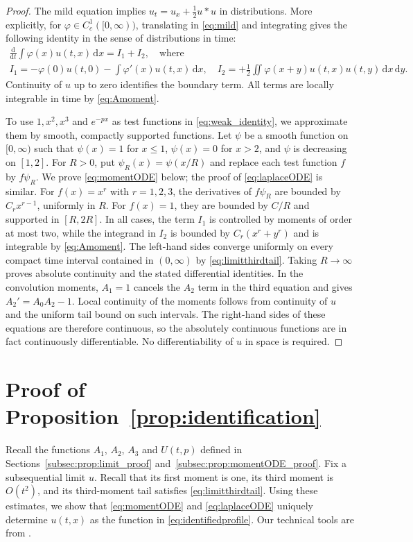 \documentclass[11pt,letterpaper,reqno]{amsart}
\numberwithin{equation}{section}
\theoremstyle{plain}
\theoremstyle{remark}
\newcommand{\dd}{\,\mathrm d}
\begin{document}
\begin{proof}
The mild equation implies $u_t=u_x+\tfrac12u*u$ in distributions. More explicitly, for $\varphi\in C_c^1([0,\infty))$, translating in \eqref{eq:mild} and integrating gives the following identity in the sense of distributions in time:
\begin{multline} \label{eq:weak_identity}
 \frac{\mathrm d}{\mathrm dt}\int\varphi(x)u(t,x)\dd x
 = I_1 + I_2, \quad \text{where} \\
 I_1 = -\varphi(0)u(t,0)-\int\varphi'(x)u(t,x)\dd x, \quad I_2 =
 +\frac12\iint\varphi(x+y)u(t,x)u(t,y)\dd x\dd y.
\end{multline}
Continuity of $u$ up to zero identifies the boundary term. All terms are locally integrable in time by \eqref{eq:Amoment}.

To use $1,x^2,x^3$ and $e^{-px}$ as test functions in \eqref{eq:weak_identity}, we approximate them by smooth, compactly supported functions. Let $\psi$ be a smooth function on $[0,\infty)$ such that $\psi(x)=1$ for $x\le1$, $\psi(x)=0$ for $x>2$, and $\psi$ is decreasing on $[1,2]$. For $R>0$, put $\psi_R(x)=\psi(x/R)$ and replace each test function $f$ by $f\psi_R$. We prove \eqref{eq:momentODE} below; the proof of \eqref{eq:laplaceODE} is similar. For $f(x)=x^r$ with $r=1,2,3$, the derivatives of $f\psi_R$ are bounded by $C_r x^{r-1}$, uniformly in $R$. For $f(x)=1$, they are bounded by $C/R$ and supported in $[R,2R]$. In all cases, the term $I_1$ is controlled by moments of order at most two, while the integrand in $I_2$ is bounded by $C_r(x^r+y^r)$ and is integrable by \eqref{eq:Amoment}. The left-hand sides converge uniformly on every compact time interval contained in $(0,\infty)$ by \eqref{eq:limitthirdtail}. Taking $R\to\infty$ proves absolute continuity and the stated differential identities. In the convolution moments, $A_1=1$ cancels the $A_2$ term in the third equation and gives $A_2'=A_0A_2-1$. Local continuity of the moments follows from continuity of $u$ and the uniform tail bound on such intervals. The right-hand sides of these equations are therefore continuous, so the absolutely continuous functions are in fact continuously differentiable. No differentiability of $u$ in space is required.
\end{proof}

\section{Proof of Proposition~\ref{prop:identification}}\label{sec:rigidity}
Recall the functions $A_1$, $A_2$, $A_3$ and $U(t,p)$ defined in Sections~\ref{subsec:prop:limit_proof} and~\ref{subsec:prop:momentODE_proof}. Fix a subsequential limit $u$. Recall that its first moment is one, its third moment is $O(t^2)$, and its third-moment tail satisfies \eqref{eq:limitthirdtail}. Using these estimates, we show that \eqref{eq:momentODE} and \eqref{eq:laplaceODE} uniquely determine $u(t,x)$ as the function in \eqref{eq:identifiedprofile}. Our technical tools are from \cite{Kotani}.
\end{document}
